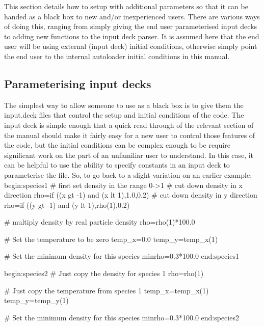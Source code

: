 \documentclass[12pt,a4paper]{article}
\newcommand{\EPOCH}{{\color{warwickdark}\fontfamily{phv}\selectfont{EPOCH}}}
\newenvironment{boxverbatim}{\lboxverbatim{none}}{\endlboxverbatim}
\begin{document}
This section details how to setup {\EPOCH} with additional parameters so that
it can be handed as a black box to new and/or inexperienced users. There are
various ways of doing this, ranging from simply giving the end user
parameterised input decks to adding new functions to the input deck parser. It
is assumed here that the end user will be using external (input deck) initial
conditions, otherwise simply point the end user to the internal autoloader
initial conditions in this manual.

\subsection{Parameterising input decks}
The simplest way to allow someone to use {\EPOCH} as a black box is to give them
the input.deck files that control the setup and initial conditions
of the code. The input deck is simple enough that a quick read through of the
relevant section of the manual should make it fairly easy for a new user to
control those features of the code, but the initial conditions can be complex
enough to be require significant work on the part of an unfamiliar user to
understand. In this case, it can be helpful to use the ability to specify
constants in an input deck to parameterise the file. So, to go back to a slight
variation on an earlier example:
\begin{boxverbatim}
begin:species1
   # first set density in the range 0->1
   # cut down density in x direction
   rho=if ((x gt -1) and (x lt 1),1.0,0.2)
   # cut down density in y direction
   rho=if ((y gt -1) and (y lt 1),rho(1),0.2)

   # multiply density by real particle density
   rho=rho(1)*100.0

   # Set the temperature to be zero
   temp_x=0.0
   temp_y=temp_x(1)

   # Set the minimum density for this species
   minrho=0.3*100.0
end:species1

begin:species2
   # Just copy the density for species 1
   rho=rho(1)

   # Just copy the temperature from species 1
   temp_x=temp_x(1)
   temp_y=temp_y(1)

   # Set the minimum density for this species
   minrho=0.3*100.0
end:species2
\end{boxverbatim}
\end{document}
